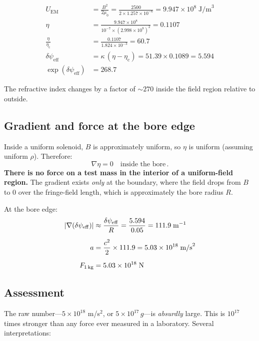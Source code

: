 \documentclass[12pt,a4paper]{article}
\newcommand{\psieff}{\psi_{\mathrm{eff}}}
\newcommand{\etac}{\eta_{\mathrm{c}}}
\begin{document}
\begin{align}
U_{\mathrm{EM}} &= \frac{B^2}{2\mu_0} = \frac{2500}{2 \times 1.257 \times 10^{-6}} = 9.947 \times 10^8 \;\text{J/m}^3 \\[6pt]
\eta &= \frac{9.947 \times 10^8}{10^{-7} \times (2.998 \times 10^8)^2} = 0.1107 \\[6pt]
\frac{\eta}{\etac} &= \frac{0.1107}{1.824 \times 10^{-3}} = 60.7 \\[6pt]
\delta\psieff &= \kappa\,(\eta - \etac) = 51.39 \times 0.1089 = 5.594 \\[6pt]
\exp(\delta\psieff) &= 268.7
\end{align}

The refractive index changes by a factor of $\sim 270$ inside the field region relative to outside.

\subsection{Gradient and force at the bore edge}

Inside a uniform solenoid, $B$ is approximately uniform, so $\eta$ is uniform (assuming uniform $\rho$).
Therefore:
\begin{equation}
\nabla\eta = 0 \quad\text{inside the bore}\,.
\end{equation}
\textbf{There is no force on a test mass in the interior of a uniform-field region.}
The gradient exists \emph{only} at the boundary, where the field drops from $B$ to 0 over the
fringe-field length, which is approximately the bore radius $R$.

At the bore edge:
\begin{align}
|\nabla(\delta\psieff)| &\approx \frac{\delta\psieff}{R} = \frac{5.594}{0.05} = 111.9 \;\text{m}^{-1} \\[6pt]
a &= \frac{c^2}{2} \times 111.9 = 5.03 \times 10^{18} \;\text{m/s}^2 \\[6pt]
F_{\text{1\,kg}} &= 5.03 \times 10^{18} \;\text{N}
\end{align}

\subsection{Assessment}

The raw number---$5 \times 10^{18}$ m/s$^2$, or $5 \times 10^{17}\,g$---is \emph{absurdly} large.
This is $10^{17}$ times stronger than any force ever measured in a laboratory.
Several interpretations:
\end{document}
